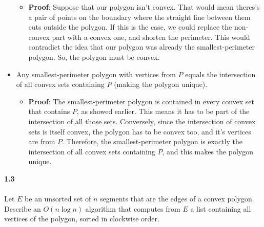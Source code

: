 \begin{itemize}
\begin{itemize}
		      \item \textbf{Proof}: Suppose that our polygon isn't convex. That would mean theres's a pair of points on the boundary where the straight line between them cuts outside the polygon. If this is the case, we could replace the non-convex part with a convex one, and shorten the perimeter. This would contradict the idea that our polygon was already the smallest-perimeter polygon. So, the polygon must be convex.
	      \end{itemize}
	\item Any smallest-perimeter polygon with vertices from $P$ equals the intersection of all convex sets containing $P$ (making the polygon unique).
	      \begin{itemize}
		      \item \textbf{Proof}: The smallest-perimeter polygon is contained in every convex set that contains $P$, as showed earlier. This means it has to be part of the intersection of all those sets. Conversely, since the intersection of convex sets is itself convex, the polygon has to be convex too, and it's vertices are from $P$. Therefore, the smallest-perimeter polygon is exactly the intersection of all convex sets containing $P$, and this makes the polygon unique.
	      \end{itemize}
\end{itemize}

\noindent
\textbf{1.3}\\\\
\noindent
Let $E$ be an unsorted set of $n$ segments that are the edges of a convex polygon. Describe an $O(n \log n)$ algorithm that computes from $E$ a list containing all vertices of the polygon, sorted in clockwise order.

